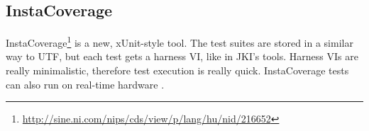 \subsection{InstaCoverage}
InstaCoverage\footnote{\url{http://sine.ni.com/nips/cds/view/p/lang/hu/nid/216652}} is a new, xUnit-style tool. The test suites are stored in a similar way to UTF, but each test gets a harness VI, like in JKI's tools. Harness VIs are really minimalistic, therefore test execution is really quick. InstaCoverage tests can also run on real-time hardware \cite{icovsite}. 